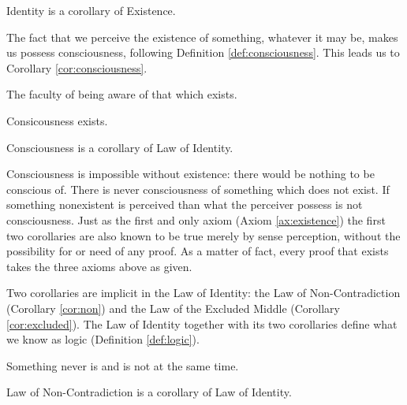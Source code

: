             \begin{remark}
                Identity is a corollary of Existence.
            \end{remark}
    
        The fact that we perceive the existence of something, whatever it may be, makes us possess consciousness, following Definition \ref{def:consciousness}. This leads us to Corollary \ref{cor:consciousness}.
        
            \begin{definition}[Consciousness]
            \label{def:consciousness}
                The faculty of being aware of that which exists.
            \end{definition}
            
            \begin{corollary}[Consciousness]
            \label{cor:consciousness}
                Consicousness exists.
            \end{corollary}

            \begin{remark}
                Consciousness is a corollary of Law of Identity.
            \end{remark}
            
        Consciousness is impossible without existence: there would be nothing to be conscious of. There is never consciousness of something which does not exist. If something nonexistent is perceived than what the perceiver possess is not consciousness. Just as the first and only axiom (Axiom \ref{ax:existence}) the first two corollaries are also known to be true merely by sense perception, without the possibility for or need of any proof. As a matter of fact, every proof that exists takes the three axioms above as given.
        
        Two corollaries are implicit in the Law of Identity: the Law of Non-Contradiction (Corollary \ref{cor:non}) and the Law of the Excluded Middle (Corollary \ref{cor:excluded}). The Law of Identity together with its two corollaries define what we know as logic (Definition \ref{def:logic}).
            
            \begin{corollary}
            \label{cor:non}
                Something never is and is not at the same time.
            \end{corollary}

            \begin{remark}
                Law of Non-Contradiction is a corollary of Law of Identity.
            \end{remark}
            
